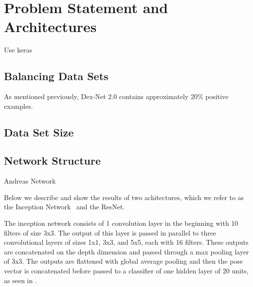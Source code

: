 
\section{Problem Statement and Architectures}
\label{sec:problem_and_archs}

Use keras ~\cite{chollet2017keras}

\subsection{Balancing Data Sets}
\label{sec:balance}

As mentioned previously, Dex-Net 2.0 contains approximately 20\% positive examples. 


\subsection{Data Set Size}
\label{sec:size}


\subsection{Network Structure}
\label{sec:archs}


Andreas Network ~\cite{viereck2017learning}

Below we describe and show the results of two achitectures, which we refer to as the Inception Network~\cite{szegedy2015going} and the ResNet.

The inception network consists of 1 convolution layer in the beginning with 10 filters of size 3x3. 
The output of this layer is passed in parallel to three convolutional layers of sizes 1x1, 3x3, and 5x5, each with 16 filters. 
These outputs are concatenated on the depth dimension and passed through a max pooling layer of 3x3. 
The outputs are flattened with global average pooling and then the pose vector is concatenated before passed to a classifier of one hidden layer of 20 units, as seen in . 


